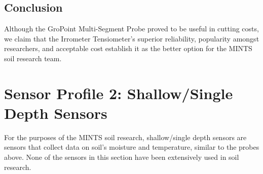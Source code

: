 \documentclass{article}
\begin{document}
\subsection{Conclusion}
Although the GroPoint Multi-Segment Probe proved to be useful in cutting costs, we claim that the Irrometer Tensiometer's superior reliability, popularity amongst researchers, and acceptable cost establish it as the better option for the MINTS soil research team.


\section{Sensor Profile 2: Shallow/Single Depth Sensors}
For the purposes of the MINTS soil research, shallow/single depth sensors are sensors that collect data on soil's moisture and temperature, similar to the probes above. None of the sensors in this section have been extensively used in soil research.
\end{document}
